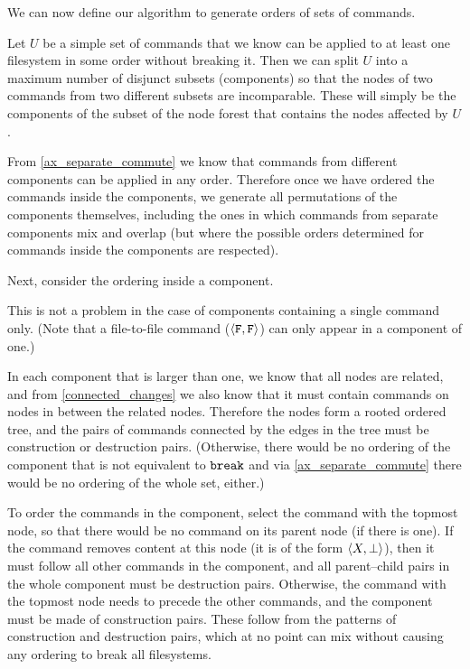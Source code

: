 \medskip

We can now define our algorithm to generate orders of sets of commands.

Let $U$ be a simple set of commands
that we know can be applied to at least one filesystem in some order without breaking it.
Then we can split $U$ into a maximum number of disjunct subsets
(components) so that the nodes of two commands from two different subsets are incomparable.
These will simply be the components of the subset of the node forest that contains 
the nodes affected by $U$.

From \cref{ax_separate_commute} we know that commands from different 
components can be applied in any order.
Therefore once we have ordered the commands inside the components, we generate
all permutations of the components themselves, including the ones
in which commands from separate components mix and overlap
(but where the possible orders determined for commands inside the components are respected).

Next, consider the ordering inside a component.

This is not a problem in the case of components containing a single command only.
(Note that a file-to-file command ($\langle{\mathtt{F},\mathtt{F}}\rangle$) can only appear in a component of one.)

In each component that is larger than one, 
we know that all nodes are related, and from \cref{connected_changes}
we also know that it must contain commands on nodes in between the related nodes.
Therefore the nodes
form a rooted ordered tree,
and the pairs of commands connected by the edges in the tree 
must be construction or destruction pairs.
(Otherwise, there would be no ordering of the component that is not equivalent to $\mathtt{break}$
and via \cref{ax_separate_commute} there would be no ordering of the whole set, either.)

To order the commands in the component,
select the command with the topmost node, so that there would be no command
on its parent node (if there is one). 
If the command removes content at this node (it is of the form $\langle{X,\bot}\rangle$), 
then it must follow all other commands in the component, and
all parent--child pairs in the whole component must be destruction pairs.
Otherwise, the command with the topmost node needs to precede the other commands,
and the component must be made of construction pairs.
These follow from the patterns of construction and destruction pairs, which
at no point can mix without causing any ordering to break all filesystems.


